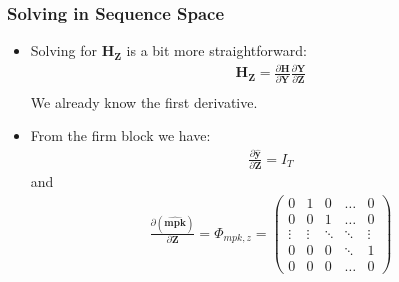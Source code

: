 \documentclass[english,xcolor=svgnames]{beamer}
\begin{document}
	
	
	\begin{frame}
		\frametitle{Solving in Sequence Space}
			\begin{itemize}
				\item Solving for $\mathbf{H}_{\mathbf{Z}}$ is a bit more straightforward:
				\begin{align*}
					\mathbf{H}_{\mathbf{Z}} = \frac{\partial \mathbf{H}}{\partial \mathbf{Y}}\frac{\partial \mathbf{Y}}{\partial \mathbf{Z}} \\
				\end{align*}
				We already know the first derivative.
				\item From the firm block we have:
				\begin{align*}
					\frac{\partial \mathbf{\hat{y}}}{\partial \mathbf{Z}} = I_T
				\end{align*}
				and
				\begin{align*}
					\frac{\partial \mathbf{(\hat{mpk})}}{\partial \mathbf{Z}}=\Phi_{mpk,z} = \begin{pmatrix}
						 0 & 1 & 0 & \hdots & 0  \\
						0 & 0 & 1 & \hdots & 0  \\
						\vdots & \vdots & \ddots & \ddots & \vdots  \\
						0 & 0 & 0 & \ddots & 1  \\
						0 & 0 & 0 & \hdots & 0
					\end{pmatrix}
				\end{align*}
			\end{itemize}
	\end{frame}
	
\end{document}
